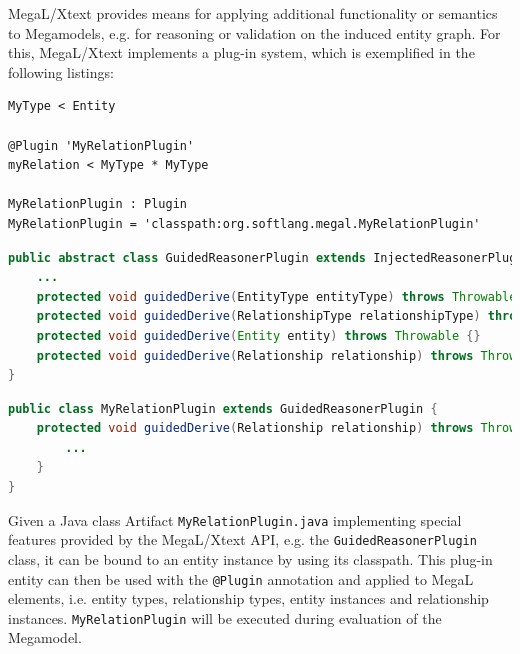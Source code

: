 \Gls{MegaL/Xtext} provides means for applying additional functionality or semantics to \glspl{Megamodel}, e.g. for reasoning or validation on the induced entity graph.
For this, \gls{MegaL/Xtext} implements a plug-in system, which is exemplified in the following listings:
\begin{lstlisting}[numbers=none]
MyType < Entity

@Plugin 'MyRelationPlugin'
myRelation < MyType * MyType

MyRelationPlugin : Plugin
MyRelationPlugin = 'classpath:org.softlang.megal.MyRelationPlugin'
\end{lstlisting}
\begin{lstlisting}[language=Java,numbers=none]
public abstract class GuidedReasonerPlugin extends InjectedReasonerPlugin {
	...
	protected void guidedDerive(EntityType entityType) throws Throwable {}
	protected void guidedDerive(RelationshipType relationshipType) throws Throwable {}
	protected void guidedDerive(Entity entity) throws Throwable {}
	protected void guidedDerive(Relationship relationship) throws Throwable {}
}
\end{lstlisting}
\begin{lstlisting}[language=Java,numbers=none]
public class MyRelationPlugin extends GuidedReasonerPlugin {
	protected void guidedDerive(Relationship relationship) throws Throwable {
		...
	}
}
\end{lstlisting}
Given a \gls{Java} class \gls{Artifact} \texttt{MyRelationPlugin.java} implementing special features provided by the \gls{MegaL/Xtext} \gls{API}, e.g. the \texttt{GuidedReasonerPlugin} class, it can be bound to an entity instance by using its classpath.
This plug-in entity can then be used with the \texttt{@Plugin} annotation and applied to \gls{MegaL} elements, i.e. entity types, relationship types, entity instances and relationship instances.
\texttt{MyRelationPlugin} will be executed during evaluation of the \gls{Megamodel}.


